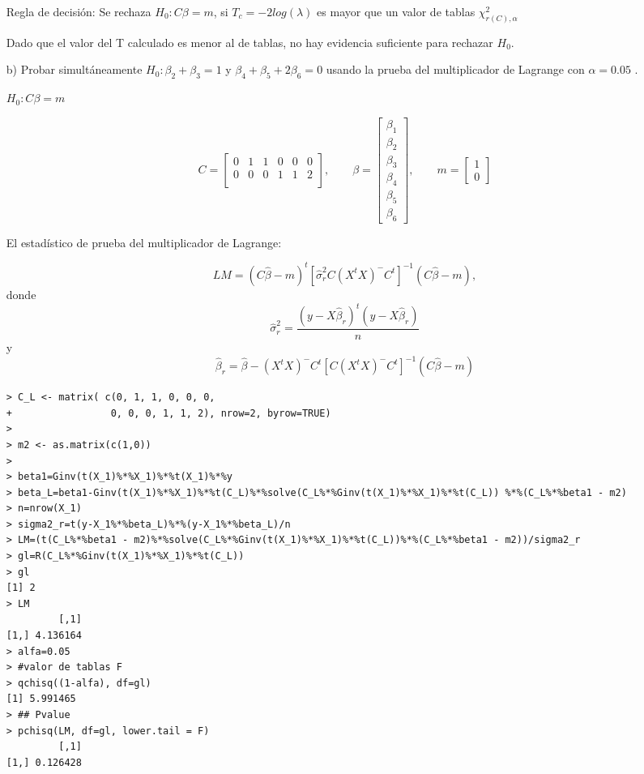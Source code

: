 \documentclass[12pt,a4paper]{report}
\begin{document}
\begin{enumerate}
Regla de decisión: Se rechaza $H_0 : C\beta = m$, si $T_c=-2 log(\lambda)$ es mayor que un valor de tablas $\chi_{r(C), \alpha}^{2}$

Dado que el valor del T calculado es menor al de tablas, no
hay evidencia suficiente para rechazar $H_{0}$. 


\item[b)] Probar simultáneamente $H_0 : \beta_2 + \beta_3 = 1$ y $\beta_4 + \beta_5 + 2\beta_6 = 0$ usando la prueba del multiplicador de Lagrange con $\alpha = 0.05$ .

$H_0 : C\beta = m$

\[
C=\begin{bmatrix}
0 & 1 & 1 & 0 & 0 & 0 \\
0 & 0 & 0 & 1 & 1 & 2 \\
\end{bmatrix}, \qquad
\beta = \begin{bmatrix}
\beta_1 \\ \beta_2 \\ \beta_3 \\ \beta_4 \\ \beta_5 \\ \beta_6
\end{bmatrix}, \qquad
m=\begin{bmatrix}
1 \\ 0 
\end{bmatrix}
\]

El estadístico de prueba del multiplicador de Lagrange:

\[LM=(C\widehat{\beta} - m)^t[\widehat{\sigma}_r^2C(X^tX)^{-}C^t]^{-1}(C\widehat{\beta} - m),\]
donde
\[\widehat{\sigma}_r^2 = \frac{(y-X\widehat{\beta}_r)^t(y-X\widehat{\beta}_r)}{n}\]
y
\[ \widehat{\beta}_r = \widehat{\beta}-(X^tX)^{-}C^t[C(X^tX)^{-}C^t]^{-1}(C\widehat{\beta} - m) \]

\begin{verbatim}
> C_L <- matrix( c(0, 1, 1, 0, 0, 0,
+                 0, 0, 0, 1, 1, 2), nrow=2, byrow=TRUE)
> 
> m2 <- as.matrix(c(1,0))
> 
> beta1=Ginv(t(X_1)%*%X_1)%*%t(X_1)%*%y
> beta_L=beta1-Ginv(t(X_1)%*%X_1)%*%t(C_L)%*%solve(C_L%*%Ginv(t(X_1)%*%X_1)%*%t(C_L)) %*%(C_L%*%beta1 - m2)
> n=nrow(X_1)
> sigma2_r=t(y-X_1%*%beta_L)%*%(y-X_1%*%beta_L)/n
> LM=(t(C_L%*%beta1 - m2)%*%solve(C_L%*%Ginv(t(X_1)%*%X_1)%*%t(C_L))%*%(C_L%*%beta1 - m2))/sigma2_r
> gl=R(C_L%*%Ginv(t(X_1)%*%X_1)%*%t(C_L))
> gl
[1] 2
> LM
         [,1]
[1,] 4.136164
> alfa=0.05
> #valor de tablas F
> qchisq((1-alfa), df=gl) 
[1] 5.991465
> ## Pvalue
> pchisq(LM, df=gl, lower.tail = F) 
         [,1]
[1,] 0.126428
\end{verbatim} 



\end{enumerate}
\end{document}
